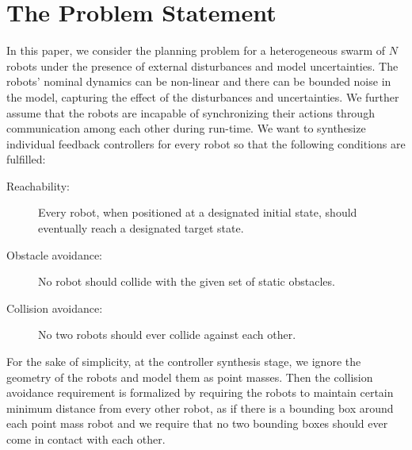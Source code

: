 
\section{The Problem Statement}
In this paper, we consider the planning problem for a heterogeneous swarm of $N$ robots under the presence of external disturbances and model uncertainties. 
The robots' nominal dynamics can be non-linear and there can be bounded noise in the model, capturing the effect of the disturbances and uncertainties.
We further assume that the robots are incapable of synchronizing their actions through communication among each other during run-time.
We want to synthesize individual feedback controllers for every robot so that the following conditions are fulfilled:
\begin{description}
	\item[Reachability:] Every robot, when positioned at a designated initial state, should eventually reach a designated target state.
	\item[Obstacle avoidance:] No robot should collide with the given set of static obstacles.
	\item[Collision avoidance:] No two robots should ever collide against each other.
\end{description}
For the sake of simplicity, at the controller synthesis stage, we ignore the geometry of the robots and model them as point masses.
Then the collision avoidance requirement is formalized by requiring the robots to maintain certain minimum distance from every other robot, as if there is a bounding box around each point mass robot and we require that no two bounding boxes should ever come in contact with each other.

